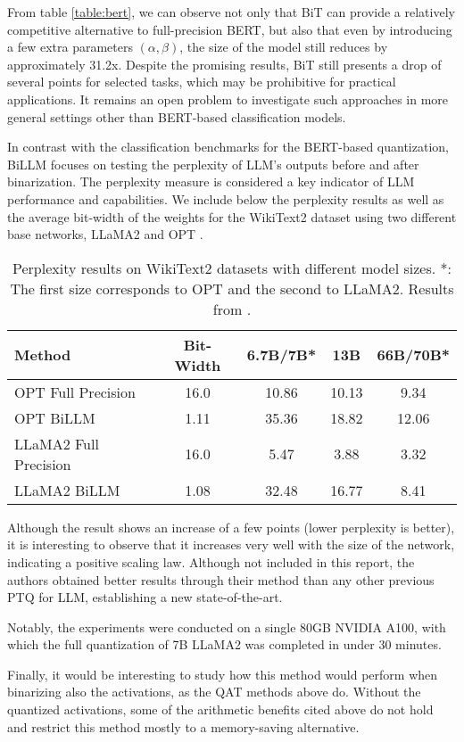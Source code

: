 From table \ref{table:bert}, we can observe not only that BiT can provide a relatively competitive alternative to full-precision BERT, but also that even by introducing a few extra parameters $(\alpha, \beta)$, the size of the model still reduces by approximately 31.2x. Despite the promising results, BiT still presents a drop of several points for selected tasks, which may be prohibitive for practical applications. It remains an open problem to investigate such approaches in more general settings other than BERT-based classification models.

\vspace{1em}

In contrast with the classification benchmarks for the BERT-based quantization, BiLLM focuses on testing the perplexity of LLM's outputs before and after binarization. The perplexity measure is considered a key indicator of LLM performance and capabilities. We include below the perplexity results as well as the average bit-width of the weights
for the WikiText2 \cite{merity2016pointer} dataset using two different base networks, LLaMA2\cite{touvron2023llama} and OPT \cite{zhang2022opt}.
\vspace{0.5em}

\begin{table}[ht!]
\small
\centering
\begin{tabular}{l c c c c} 
\hline
  Method & Bit-Width & 6.7B/7B* & 13B & 66B/70B* \\
\hline
    OPT Full Precision & 16.0 & 10.86 & 10.13  & 9.34 \\
    OPT BiLLM & 1.11 & 35.36 & 18.82  & 12.06 \\
\hline
    LLaMA2 Full Precision & 16.0 & 5.47 & 3.88 & 3.32 \\
    LLaMA2 BiLLM & 1.08 & 32.48 & 16.77 & 8.41 \\
\hline
\end{tabular}
\caption{Perplexity results on WikiText2 datasets with different model sizes. *: The first size corresponds to OPT and the second to LLaMA2. Results from \cite{huang2024billm}.}
\label{table:billm}
\end{table}

Although the result shows an increase of a few points (lower perplexity is better), it is interesting to observe that it increases very well with the size of the network, indicating a positive scaling law. Although not included in this report, the authors obtained better results through their method than any other previous PTQ for LLM, establishing a new state-of-the-art. 

Notably, the experiments were conducted on a single 80GB NVIDIA A100, with which the full quantization of 7B LLaMA2 was completed in under 30 minutes.

Finally, it would be interesting to study how this method would perform when binarizing also the activations, as the QAT methods above do. Without the quantized activations, some of the arithmetic benefits cited above do not hold and restrict this method mostly to a memory-saving alternative.